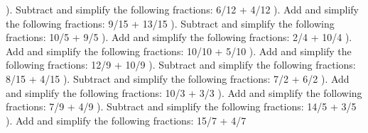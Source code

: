 \documentclass{article}%
\begin{document}
\newline%
). Subtract and simplify the following fractions: 6/12 + 4/12%
\newline%
\newline%
). Add and simplify the following fractions: 9/15 + 13/15%
\newline%
\newline%
). Subtract and simplify the following fractions: 10/5 + 9/5%
\newline%
\newline%
). Add and simplify the following fractions: 2/4 + 10/4%
\newline%
\newline%
). Add and simplify the following fractions: 10/10 + 5/10%
\newline%
\newline%
). Add and simplify the following fractions: 12/9 + 10/9%
\newline%
\newline%
). Subtract and simplify the following fractions: 8/15 + 4/15%
\newline%
\newline%
). Subtract and simplify the following fractions: 7/2 + 6/2%
\newline%
\newline%
). Add and simplify the following fractions: 10/3 + 3/3%
\newline%
\newline%
). Add and simplify the following fractions: 7/9 + 4/9%
\newline%
\newline%
). Subtract and simplify the following fractions: 14/5 + 3/5%
\newline%
\newline%
). Add and simplify the following fractions: 15/7 + 4/7%
\newline%
\newline%
\newline%
\end{document}
